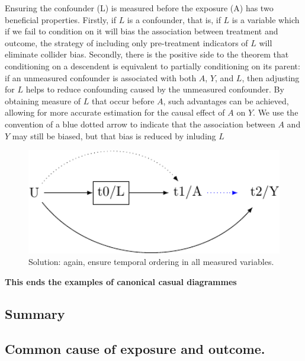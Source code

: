 \documentclass[
  singlecolumn]{report}
\begin{document}
Ensuring the confounder (L) is measured before the exposure (A) has two
beneficial properties. Firstly, if \(L\) is a confounder, that is, if
\(L\) is a variable which if we fail to condition on it will bias the
association between treatment and outcome, the strategy of including
only pre-treatment indicators of \(L\) will eliminate collider bias.
Secondly, there is the positive side to the theorem that conditioning on
a descendent is equivalent to partially conditioning on its parent: if
an unmeasured confounder is associated with both \(A\), \(Y\), and
\(L\), then adjusting for \(L\) helps to reduce confounding caused by
the unmeasured confounder. By obtaining measure of \(L\) that occur
before \(A\), such advantages can be achieved, allowing for more
accurate estimation for the causal effect of \(A\) on \(Y\). We use the
convention of a blue dotted arrow to indicate that the association
between \(A\) and \(Y\) may still be biased, but that bias is reduced by
inluding \(L\)

\begin{figure}

{\centering \includegraphics[width=1\textwidth,height=\textheight]{causal-dags_files/figure-pdf/fig-dag-descendent-solution-1.pdf}

}

\caption{\label{fig-dag-descendent-solution}Solution: again, ensure
temporal ordering in all measured variables.}

\end{figure}

\textbf{This ends the examples of canonical casual diagrammes}

\hypertarget{summary}{%
\subsection{Summary}\label{summary}}

\hypertarget{common-cause-of-exposure-and-outcome.}{%
\subsection{Common cause of exposure and
outcome.}\label{common-cause-of-exposure-and-outcome.}}
\end{document}
